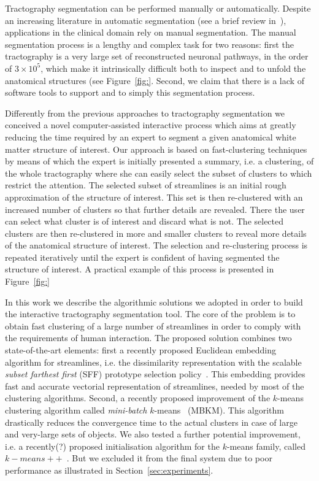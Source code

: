 Tractography segmentation can be performed manually or
automatically. Despite an increasing literature in automatic
segmentation (see a brief review in~\cite{WANG?}), applications in the
clinical domain rely on manual segmentation. The manual segmentation
process is a lengthy and complex task for two reasons: first the
tractography is a very large set of reconstructed neuronal pathways,
in the order of $3 \times 10^5$, which make it intrinsically difficult
both to inspect and to unfold the anatomical structures (see
Figure~\ref{fig:}. Second, we claim that there is a lack of software
tools to support and to simply this segmentation process.

Differently from the previous approaches to tractography segmentation
we conceived a novel computer-assisted interactive process which aims
at greatly reducing the time required by an expert to segment a given
anatomical white matter structure of interest. Our approach is based
on fast-clustering techniques by means of which the expert is
initially presented a summary, i.e. a clustering, of the whole
tractography where she can easily select the subset of clusters to
which restrict the attention. The selected subset of streamlines is an
initial rough approximation of the structure of interest. This set is
then re-clustered with an increased number of clusters so that further
details are revealed. There the user can select what cluster is of
interest and discard what is not. The selected clusters are then
re-clustered in more and smaller clusters to reveal more details of
the anatomical structure of interest. The selection and re-clustering
process is repeated iteratively until the expert is confident of
having segmented the structure of interest. A practical example of
this process is presented in Figure~\ref{fig:}


In this work we describe the algorithmic solutions we adopted in order
to build the interactive tractography segmentation tool. The core of
the problem is to obtain fast clustering of a large number of
streamlines in order to comply with the requirements of human
interaction. The proposed solution combines two state-of-the-art
elements: first a recently proposed Euclidean embedding algorithm for
streamlines, i.e. the dissimilarity representation with the scalable
\emph{subset farthest first} (SFF) prototype selection
policy~\cite{olivetti2012dissimilarity}. This embedding provides fast
and accurate vectorial representation of streamlines, needed by most
of the clustering algorithms. Second, a recently proposed improvement
of the $k$-means clustering algorithm called \emph{mini-batch}
$k$-means~\cite{sculley2010web} (MBKM). This algorithm drastically
reduces the convergence time to the actual clusters in case of large
and very-large sets of objects. We also tested a further potential
improvement, i.e. a recently(?) proposed initialisation algorithm for
the $k$-means family, called $k-means++$~\cite{arthur2007kmeans}. But
we excluded it from the final system due to poor performance as
illustrated in Section~\ref{sec:experiments}.

